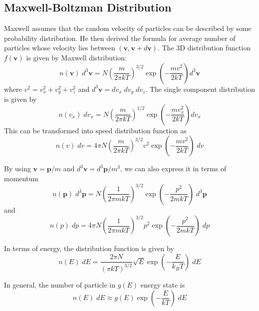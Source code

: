 \documentclass[../../../Main.tex]{subfiles}
\begin{document}
\subsection{Maxwell-Boltzman Distribution} 
Maxwell assumes that the random velocity of particles can be described by some probability distribution. He then derived the formula for average number of particles whose velocity lies between $(\mathbf{v},\mathbf{v}+d\mathbf{v})$. The 3D distribution function $f(\mathbf{v})$ is given by Maxwell distribution:
\begin{equation*}
    n(\mathbf{v})\;d^3\mathbf{v}=N\left(\frac{m}{2\pi k T}\right)^{3/2}\exp\left(-\frac{m v^2}{2k T}\right)d^3\mathbf{v}
\end{equation*} 
where $v^2=v_x^2+v_y^2+v_z^2$ and $d^3\mathbf{v}=dv_x\; dv_y\; dv_z$. The single component distribution is given by 
\begin{equation*}
    n(v_x)\;dv_x=N\left(\frac{m}{2\pi k T}\right)^{1/2}\exp\left(-\frac{m v_x^2}{2k T}\right)dv_x
\end{equation*} This can be transformed into speed distribution function as 
\begin{equation*}
    n(v)\;dv=4\pi N\left(\frac{m}{2\pi k T}\right)^{3/2}v^2\exp\left(-\frac{m v^2}{2k T}\right)\;dv
\end{equation*}

By using $\mathbf{v}=\mathbf{p}/m$ and $d^3\mathbf{v}=d^3\mathbf{p}/m^3$, we can also express it in terms of momentum
\begin{equation*}
    n(\mathbf{p})\; d^3\mathbf{p}=N\left(\frac{1}{2\pi mkT}\right)^{3/2}\exp\left(-\frac{p^2}{2mkT}\right)\; d^3\mathbf{p}
\end{equation*}
and 
\begin{equation*}
    n(p)\; dp=4\pi N \left(\frac{1}{ 2\pi mkT}\right)^{3/2}p^2\exp\left(-\frac{p^2}{2mkT}\right)\;dp
\end{equation*}

In terms of energy, the distribution function is given by 
\begin{equation*}
    n(E)\;dE=\frac{2\pi N}{(\pi kT)^{3/2}}\sqrt{E}\exp\left(-\frac{E}{k_BT}\right)\;dE
\end{equation*}

In general, the number of particle in $g(E)$ energy state is 
\begin{equation*}
    n(E)\;dE\approx g(E)\exp\left(-\frac{E}{kT}\right)\;dE
\end{equation*}
\end{document}
